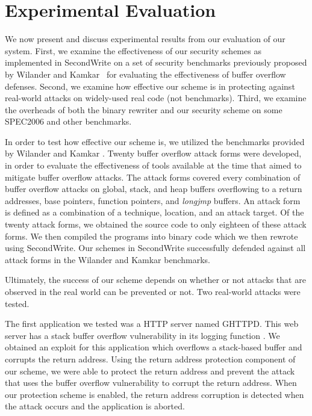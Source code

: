 \section{Experimental Evaluation}
\label{sec:results}

We now present and discuss experimental results from our evaluation of
our system. First, we examine the effectiveness of our security
schemes as implemented in SecondWrite on a set of security benchmarks
previously proposed by Wilander and Kamkar~\cite{wilander2003} for
evaluating the effectiveness of buffer overflow defenses. Second, we
examine how effective our scheme is in protecting against real-world
attacks on widely-used real code (not benchmarks). Third, we examine
the overheads of both the binary rewriter and our security scheme on
some SPEC2006 and other benchmarks.

 In order to test how effective our scheme
is, we utilized the benchmarks provided by Wilander and Kamkar
\cite{wilander2003}. Twenty buffer overflow attack forms were
developed, in order to evaluate the effectiveness of tools available
at the time that aimed to mitigate buffer overflow attacks. The attack
forms covered every combination of buffer overflow attacks on global,
stack, and heap buffers overflowing to a return addresses, base
pointers, function pointers, and \emph{longjmp} buffers. An attack
form is defined as a combination of a technique, location, and an
attack target. Of the twenty attack forms, we obtained the source code
to only eighteen of these attack forms. We then compiled the programs into binary code which we then rewrote using SecondWrite.
Our schemes in SecondWrite successfully
defended against all attack forms in the Wilander and Kamkar
benchmarks.

 Ultimately, the success of our scheme depends on whether or not attacks that are observed in the real world can be prevented or not. Two real-world attacks were tested.

The first application we tested was a HTTP server named GHTTPD. This web server has a stack buffer overflow vulnerability in its logging function \cite{ghttpd}. We obtained an exploit for this application which overflows a stack-based buffer and corrupts the return address. Using the return address protection component of our scheme, we were able to protect the return address and prevent the attack that uses the buffer overflow vulnerability to  corrupt the return address. When our protection scheme is enabled, the return address corruption is detected when the attack occurs and the application is aborted.

